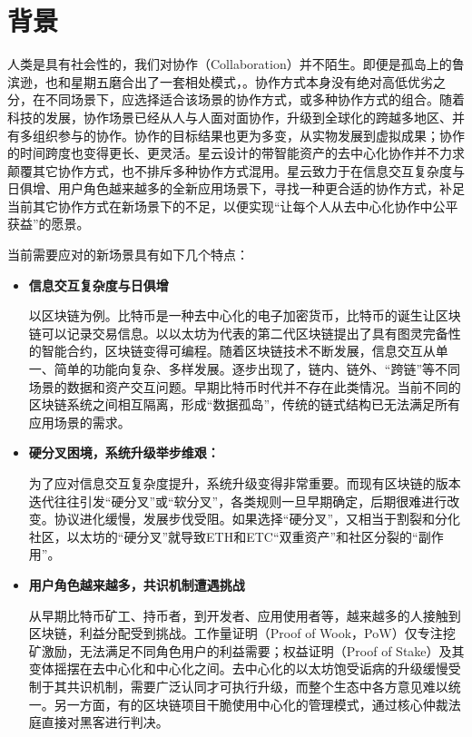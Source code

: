 \section{背景}

人类是具有社会性的，我们对协作（Collaboration）并不陌生。即便是孤岛上的鲁滨逊，也和星期五磨合出了一套相处模式，。协作方式本身没有绝对高低优劣之分，在不同场景下，应选择适合该场景的协作方式，或多种协作方式的组合。随着科技的发展，协作场景已经从人与人面对面协作，升级到全球化的跨越多地区、并有多组织参与的协作。协作的目标结果也更为多变，从实物发展到虚拟成果；协作的时间跨度也变得更长、更灵活。星云设计的带智能资产的去中心化协作并不力求颠覆其它协作方式，也不排斥多种协作方式混用。星云致力于在信息交互复杂度与日俱增、用户角色越来越多的全新应用场景下，寻找一种更合适的协作方式，补足当前其它协作方式在新场景下的不足，以便实现“让每个人从去中心化协作中公平获益”的愿景。

当前需要应对的新场景具有如下几个特点：

\begin{itemize}
\item \textbf{信息交互复杂度与日俱增}

以区块链为例。比特币是一种去中心化的电子加密货币，比特币的诞生让区块链可以记录交易信息。以以太坊为代表的第二代区块链提出了具有图灵完备性的智能合约，区块链变得可编程。随着区块链技术不断发展，信息交互从单⼀、简单的功能向复杂、多样发展。逐步出现了，链内、链外、“跨链”等不同场景的数据和资产交互问题。早期比特币时代并不存在此类情况。当前不同的区块链系统之间相互隔离，形成“数据孤岛”，传统的链式结构已无法满足所有应用场景的需求。

\item \textbf{硬分叉困境，系统升级举步维艰：}

为了应对信息交互复杂度提升，系统升级变得非常重要。而现有区块链的版本迭代往往引发“硬分叉”或“软分叉”，各类规则一旦早期确定，后期很难进行改变。协议进化缓慢，发展步伐受阻。如果选择“硬分叉”，又相当于割裂和分化社区，以太坊的“硬分叉”就导致ETH和ETC“双重资产”和社区分裂的“副作用”。

\item \textbf{用户角色越来越多，共识机制遭遇挑战}

从早期比特币矿工、持币者，到开发者、应用使用者等，越来越多的人接触到区块链，利益分配受到挑战。工作量证明（Proof of Wook，PoW）仅专注挖矿激励，无法满足不同角色用户的利益需要；权益证明（Proof of Stake）及其变体摇摆在去中心化和中心化之间。去中心化的以太坊饱受诟病的升级缓慢受制于其共识机制，需要广泛认同才可执行升级，而整个生态中各方意见难以统一。另一方面，有的区块链项目干脆使用中心化的管理模式，通过核心仲裁法庭直接对黑客进行判决。
\end{itemize}




